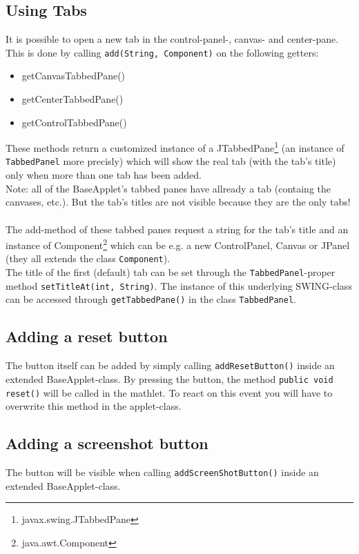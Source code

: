 \documentclass[a4paper,12pt]{book}
\begin{document}
  \subsection{Using Tabs}
    It is possible to open a new tab in the control-panel-, canvas- and center-pane.
    This is done by calling \verb|add(String, Component)| on the following getters:
    \begin{itemize}
      \item getCanvasTabbedPane()
      \item getCenterTabbedPane()
      \item getControlTabbedPane()
    \end{itemize}
  These methods return a customized instance of a JTabbedPane\footnote{javax.swing.JTabbedPane}
  (an instance of \verb|TabbedPanel| more precisly) which will show the real tab
  (with the tab's title) only when more than one tab has been added.\\
  Note: all of the BaseApplet's tabbed panes have allready a tab (containg the canvases, etc.).
  But the tab's titles are not visible because they are the only tabs!\\\\
  The add-method of these tabbed panes request a string for the tab's title and an
  instance of Component\footnote{java.awt.Component} which can be e.g. a new 
  ControlPanel, Canvas or JPanel (they all extends the class \verb|Component|).\\
  The title of the first (default) tab can be set through the \verb|TabbedPanel|-proper
  method \verb|setTitleAt(int, String)|. The instance of this underlying SWING-class
  can be accessed through \verb|getTabbedPane()| in the class \verb|TabbedPanel|.
  
  \subsection{Adding a reset button}
  The button itself can be added by simply calling \verb|addResetButton()| inside
  an extended BaseApplet-class. By pressing the button, the method 
  \verb|public void reset()| will be called in the mathlet. To react on this event
  you will have to overwrite this method in the applet-class.
  
  \subsection{Adding a screenshot button}
    The button will be visible when calling \verb|addScreenShotButton()| inside an
    extended BaseApplet-class.
  
\end{document}
